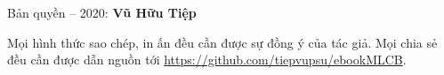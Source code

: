 \thispagestyle{empty}

\vspace{1cm} 

\vspace{1cm}
Bản quyền  -- 2020: \textbf{Vũ Hữu Tiệp}

Mọi hình thức sao chép, in ấn đều cần được sự đồng ý của tác giả. Mọi chia sẻ đều cần được dẫn nguồn tới \url{https://github.com/tiepvupsu/ebookMLCB}.
